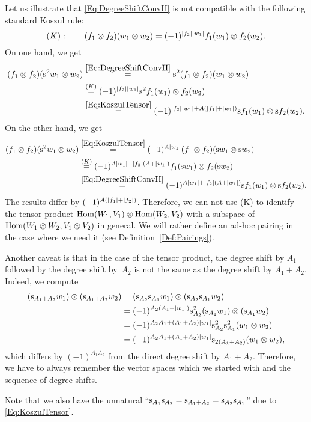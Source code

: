 \documentclass[\MainFolder/Text.tex]{subfiles}
\begin{document}
\begin{Remark}\label{Rem:BadConvention}
Let us illustrate that \eqref{Eq:DegreeShiftConvII} is not compatible with the following standard Koszul rule:
\begin{equation*}
(K):\qquad (f_1 \otimes f_2)(w_1 \otimes w_2) = (-1)^{|f_2||w_1|} f_1(w_1) \otimes f_2(w_2).
\end{equation*}
On one hand, we get 
$$\begin{aligned}
(f_1 \otimes f_2)(\mathrm{s}^2 w_1 \otimes w_2) &\overset{\eqref{Eq:DegreeShiftConvII}}{=} \mathrm{s}^2 (f_1\otimes f_2)(w_1 \otimes w_2) \\
& \overset{(K)}{=} (-1)^{|f_2||w_1|} \mathrm{s}^2 f_1(w_1) \otimes f_2(w_2)  \\
& \overset{\eqref{Eq:KoszulTensor}}{=} (-1)^{|f_2||w_1| + A(|f_1| + |w_1|)} \mathrm{s} f_1(w_1) \otimes \mathrm{s} f_2(w_2).
\end{aligned}$$
On the other hand, we get
$$\begin{aligned}
(f_1 \otimes f_2)(\mathrm{s}^2 w_1 \otimes w_2) &\overset{\eqref{Eq:KoszulTensor}}{=} (-1)^{A|w_1|}(f_1 \otimes f_2)(\mathrm{s} w_1 \otimes \mathrm{s} w_2)\\
&\overset{(K)}{=} (-1)^{A|w_1| + |f_2|(A+|w_1|)} f_1(\mathrm{s} w_1) \otimes f_2(\mathrm{s} w_2)\\ &\overset{\eqref{Eq:DegreeShiftConvII}}{=}(-1)^{A|w_1|+ |f_2|(A+|w_1|)} \mathrm{s} f_1(w_1) \otimes \mathrm{s} f_2(w_2).
\end{aligned}$$
The results differ by $(-1)^{A(|f_1|+|f_2|)}$. Therefore, we can not use (K) to identify the tensor product $\mathrm{Hom}(W_1,V_1)\otimes \mathrm{Hom}(W_2,V_2)$ with a subspace of $\mathrm{Hom}(W_1\otimes W_2, V_1\otimes V_2)$ in general. We will rather define an ad-hoc pairing in the case where we need it (see Definition~\ref{Def:Pairings}).

Another caveat is that in the case of the tensor product, the degree shift by $A_1$ followed by the degree shift by~$A_2$ is not the same as the degree shift by $A_1 + A_2$. Indeed, we compute
$$\begin{aligned}
(\mathrm{s}_{A_1 + A_2}w_1) \otimes (\mathrm{s}_{A_1 + A_2}w_2) &=
(\mathrm{s}_{A_2} \mathrm{s}_{A_1}w_1) \otimes (\mathrm{s}_{A_2}\mathrm{s}_{A_1} w_2) \\ &= (-1)^{A_2(A_1 + |w_1|)}\mathrm{s}_{A_2}^2 (\mathrm{s}_{A_1} w_1) \otimes (\mathrm{s}_{A_1} w_2) \\
&= (-1)^{A_2 A_1 + (A_1 + A_2)|w_1|} \mathrm{s}_{A_2}^2 \mathrm{s}_{A_1}^2 (w_1 \otimes w_2) \\ &= (-1)^{A_2 A_1 + (A_1 + A_2)|w_1|} \mathrm{s}_{2(A_1 + A_2)} (w_1 \otimes w_2),
\end{aligned}$$
which differs by $(-1)^{A_1 A_2}$ from the direct degree shift by $A_1 + A_2$. Therefore, we have to always remember the vector spaces which we started with and the sequence of degree shifts. 

Note that we also have the unnatural ``$\mathrm{s}_{A_1} \mathrm{s}_{A_2} = \mathrm{s}_{A_1 + A_2} = \mathrm{s}_{A_2} \mathrm{s}_{A_1}$'' due to \eqref{Eq:KoszulTensor}.
\end{Remark}
\end{document}
